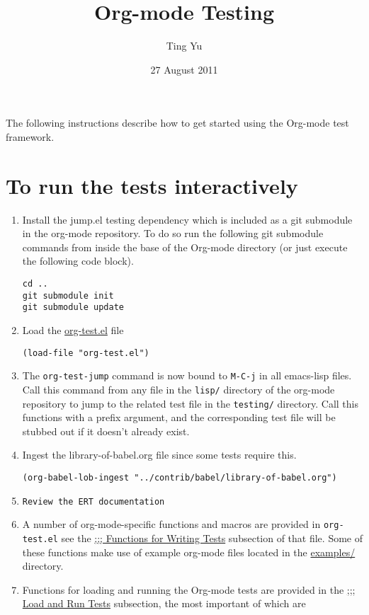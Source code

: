 \documentclass[11pt]{article}
\title{Org-mode Testing}
\author{Ting Yu}
\date{27 August 2011}
\begin{document}
\maketitle

\setcounter{tocdepth}{3}
\tableofcontents
\vspace*{1cm}

The following instructions describe how to get started using the
Org-mode test framework.

\section{To run the tests interactively}
\label{sec-1}

\begin{enumerate}
\item Install the jump.el testing dependency which is included as a git
   submodule in the org-mode repository.  To do so run the following
   git submodule commands from inside the base of the Org-mode
   directory (or just execute the following code block).


\begin{verbatim}
cd ..
git submodule init
git submodule update
\end{verbatim}
\item Load the \href{file:///home/yuting/src/org-mode/testing/org-test.el}{org-test.el} file

\begin{verbatim}
(load-file "org-test.el")
\end{verbatim}
\item The \texttt{org-test-jump} command is now bound to \texttt{M-C-j} in all
   emacs-lisp files.  Call this command from any file in the \texttt{lisp/}
   directory of the org-mode repository to jump to the related test
   file in the \texttt{testing/} directory.  Call this functions with a
   prefix argument, and the corresponding test file will be stubbed
   out if it doesn't already exist.
\item Ingest the library-of-babel.org file since some tests require this.

\begin{verbatim}
(org-babel-lob-ingest "../contrib/babel/library-of-babel.org")
\end{verbatim}
\item \texttt{Review the ERT documentation}
\item A number of org-mode-specific functions and macros are provided in
   \texttt{org-test.el} see the \href{file:///home/yuting/src/org-mode/testing/org-test.el}{;;; Functions for Writing Tests} subsection of
   that file.  Some of these functions make use of example org-mode
   files located in the \href{file:///home/yuting/src/org-mode/testing/examples}{examples/} directory.
\item Functions for loading and running the Org-mode tests are provided
   in the \href{file:///home/yuting/src/org-mode/testing/org-test.el}{;;; Load and Run Tests} subsection, the most important of
   which are


\end{enumerate}
\end{document}
